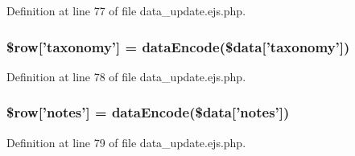 \-Definition at line 77 of file data\-\_\-update.\-ejs.\-php.

\hypertarget{miscellaneous_2mysettings_2data__update_8ejs_8php_ac3ee7cf124d7401bbb138317989b316c}{
\subsubsection[{\$row}]{\setlength{\rightskip}{0pt plus 5cm}\$row\mbox{[}'taxonomy'\mbox{]} = {\bf data\-Encode}(\$data\mbox{[}'taxonomy'\mbox{]})}}\label{miscellaneous_2mysettings_2data__update_8ejs_8php_ac3ee7cf124d7401bbb138317989b316c}


\-Definition at line 78 of file data\-\_\-update.\-ejs.\-php.

\hypertarget{miscellaneous_2mysettings_2data__update_8ejs_8php_a6cd140f95df717cfed217fe478482645}{
\subsubsection[{\$row}]{\setlength{\rightskip}{0pt plus 5cm}\$row\mbox{[}'notes'\mbox{]} = {\bf data\-Encode}(\$data\mbox{[}'notes'\mbox{]})}}\label{miscellaneous_2mysettings_2data__update_8ejs_8php_a6cd140f95df717cfed217fe478482645}


\-Definition at line 79 of file data\-\_\-update.\-ejs.\-php.

